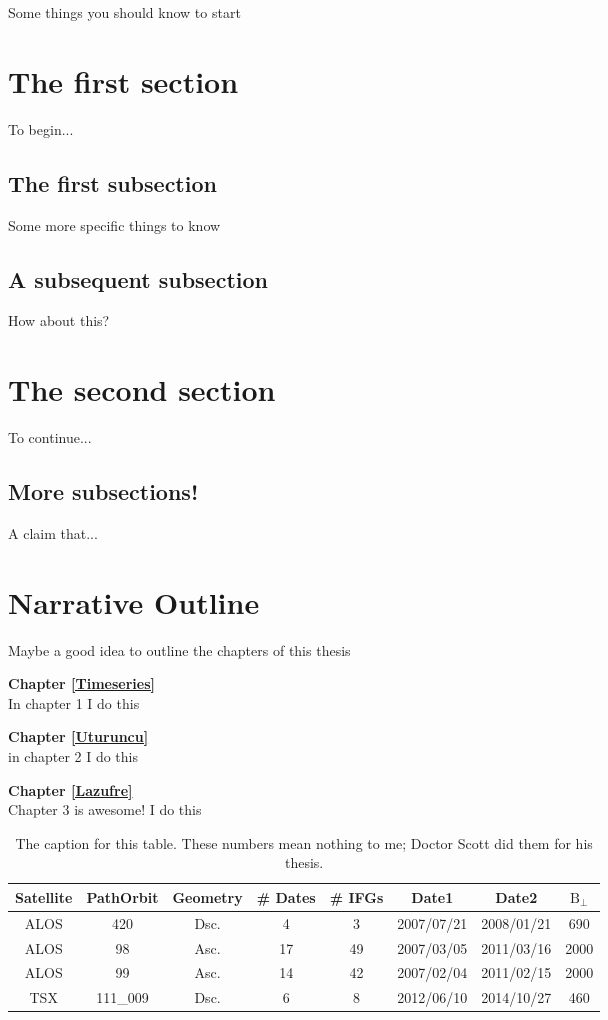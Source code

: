 \documentclass[phd,draft]{cornell}
\begin{document}
Some things you should know to start

\section{The first section}
\label{first}
To begin...
\subsection{The first subsection}
\label{utulaz}
Some more specific things to know

\subsection{A subsequent subsection}
How about this?

\section{The second section}
\label{GVD}
To continue...

\subsection{More subsections!}
A claim that...

\section{Narrative Outline}
Maybe a good idea to outline the chapters of this thesis

\textbf{Chapter \ref{Timeseries}}\\
In chapter 1 I do this

\textbf{Chapter \ref{Uturuncu}}\\
in chapter 2 I do this

\textbf{Chapter \ref{Lazufre}}\\
Chapter 3 is awesome!  I do this

\begin{table}
\begin{tabular}{cccccccc}
\hline
Satellite & Path\/Orbit & Geometry & \# Dates    & \# IFGs  & Date1      &  Date2     &  $\mathrm{B_{\perp}}$  \\
\hline
ALOS & 420  & Dsc.  & 4        & 3      & 2007/07/21 & 2008/01/21 & 690   \\
ALOS & 98  &  Asc.   & 17        & 49      & 2007/03/05 & 2011/03/16 & 2000   \\
ALOS & 99  & Asc.     & 14        & 42      & 2007/02/04 & 2011/02/15 & 2000   \\
TSX & 111\_009  & Dsc. & 6 & 8 	& 2012/06/10 & 2014/10/27 & 460  \\
\end{tabular}
\caption[A heading for this table]
{The caption for this table. These numbers mean nothing to me;  Doctor Scott did them for his thesis.}
\label{tab:newdata}
\end{table}
\end{document}
